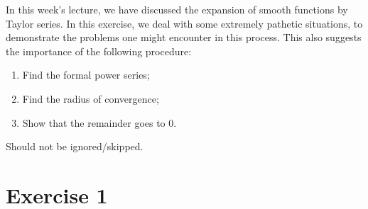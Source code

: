 \documentclass[11pt, cyan, night, 0.5in]{LatexTemplate/hw}
\begin{document}

In this week's lecture, we have discussed the expansion of smooth functions by Taylor series. In this exercise, we deal with some extremely pathetic situations, to demonstrate the problems one might encounter in this process. This also suggests the importance of the following procedure:
\begin{enumerate}
    \item Find the formal power series;
    \item Find the radius of convergence;
    \item Show that the remainder goes to 0.
\end{enumerate}
Should not be ignored/skipped.


\section*{Exercise 1}

\end{document}
